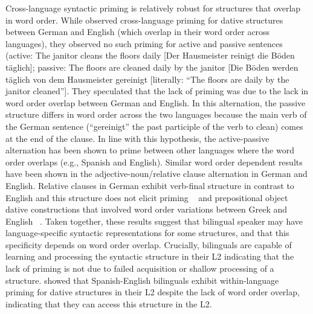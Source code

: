 Cross-language syntactic priming is relatively robust for structures that overlap in word order. While  \citet{Loebell2003} observed cross-language priming for dative structures between German and English (which overlap in their word order across languages), they observed no such priming for active and passive sentences (active: The janitor cleans the floors daily [Der Hausmeister reinigt die B\"{o}den t\"{a}glich]; passive: The floors are cleaned daily by the janitor [Die B\"{o}den werden t\"{a}glich von dem Hausmeister gereinigt [literally: ``The floors are daily by the janitor cleaned'']. They speculated that the lack of priming was due to the lack in word order overlap between German and English. In this alternation, the passive structure differs in word order across the two languages because the main verb of the German sentence (``gereinigt'' the past participle of the verb to clean) comes at the end of the clause. In line with this hypothesis, the active-passive alternation has been shown to prime between other languages where the word order overlaps (e.g., Spanish and English). Similar word order dependent results have been shown in the adjective-noun\slash relative clause alternation in German and English. Relative clauses in German exhibit verb-final structure in contrast to English and this structure does not elicit priming ~\citep{Bernolet2007} and prepositional object dative constructions that involved word order variations between Greek and English ~\citep{Salamoura2007}. Taken together, these results suggest that bilingual speaker may have language-specific syntactic representations for some structures, and that this specificity depends on word order overlap. Crucially, bilinguals are capable of learning and processing the syntactic structure in their L2 indicating that the lack of priming is not due to failed acquisition or shallow processing of a structure.  \citet{Flett2012} showed that Spanish-English bilinguals exhibit within-language priming for dative structures in their L2 despite the lack of word order overlap, indicating that they can access this structure in the L2. 

